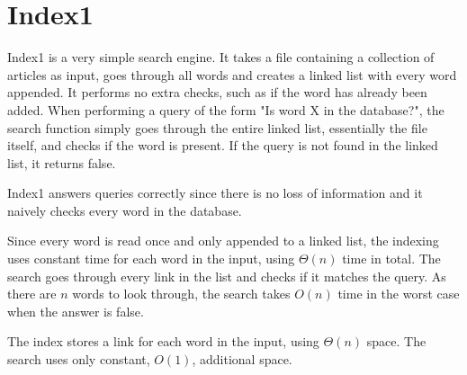 \section{Index1}

Index1 is a very simple search engine. It takes a file containing a collection of articles as input, goes through all words and creates a linked list with every word appended. It performs no extra checks, such as if the word has already been added. When performing a query of the form "Is word X in the database?", the search function simply goes through the entire linked list, essentially the file itself, and checks if the word is present. If the query is not found in the linked list, it returns false. 

Index1 answers queries correctly since there is no loss of information and it naively checks every word in the database. 

Since every word is read once and only appended to a linked list, the indexing uses constant time for each word in the input, using $\Theta(n)$ time in total. The search goes through every link in the list and checks if it matches the query. As there are $n$ words to look through, the search takes $O(n)$ time in the worst case when the answer is false. 

The index stores a link for each word in the input, using $\Theta(n)$ space. The search uses only constant, $O(1)$, additional space. 
